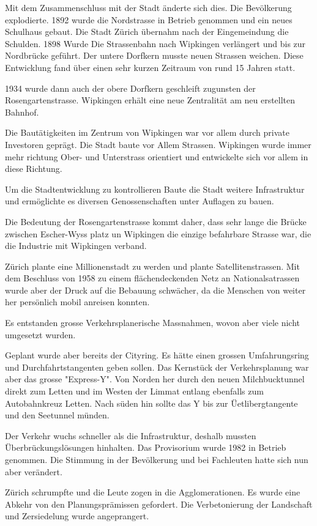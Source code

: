 \documentclass[a4paper,11pt,ngerman]{scrartcl}
\begin{document}
Mit dem Zusammenschluss mit der Stadt änderte sich dies. Die Bevölkerung
explodierte. 1892 wurde die Nordstrasse in Betrieb genommen und ein neues
Schulhaus gebaut. Die Stadt Zürich übernahm nach der Eingemeindung die
Schulden. 1898 Wurde Die Strassenbahn nach Wipkingen verlängert und bis zur
Nordbrücke geführt. Der untere Dorfkern musste neuen Strassen weichen. Diese
Entwicklung fand über einen sehr kurzen Zeitraum von rund 15 Jahren statt.

1934 wurde dann auch der obere Dorfkern geschleift zugunsten der
Rosengartenstrasse. Wipkingen erhält eine neue Zentralität am neu erstellten
Bahnhof.

Die Bautätigkeiten im Zentrum von Wipkingen war vor allem durch private
Investoren geprägt. Die Stadt baute vor Allem Strassen. Wipkingen wurde
immer mehr richtung Ober- und Unterstrass orientiert und entwickelte sich
vor allem in diese Richtung.

Um die Stadtentwicklung zu kontrollieren Baute die Stadt weitere
Infrastruktur und ermöglichte es diversen Genossenschaften unter Auflagen zu
bauen.

Die Bedeutung der Rosengartenstrasse kommt daher, dass sehr lange die Brücke
zwischen Escher-Wyss platz un Wipkingen die einzige befahrbare Strasse war,
die die Industrie mit Wipkingen verband.

Zürich plante eine Millionenstadt zu werden und plante
Satellitenstrassen. Mit dem Beschluss von 1958 zu einem flächendeckenden
Netz an Nationalsatrassen wurde aber der Druck auf die Bebauung schwächer,
da die Menschen von weiter her persönlich mobil anreisen konnten.

Es entstanden grosse Verkehrsplanerische Massnahmen, wovon aber viele nicht
umgesetzt wurden.

Geplant wurde aber bereits der Cityring. Es hätte einen grossen
Umfahrungsring und Durchfahrtstangenten geben sollen. Das Kernstück der
Verkehrsplanung war aber das grosse "Express-Y". Von Norden her durch den
neuen Milchbucktunnel direkt zum Letten und im Westen der Limmat entlang
ebenfalls zum Autobahnkreuz Letten. Nach süden hin sollte das Y bis zur
Üetlibergtangente und den Seetunnel münden.

Der Verkehr wuchs schneller als die Infrastruktur, deshalb mussten
Überbrückungslösungen hinhalten. Das Provisorium wurde 1982 in Betrieb
genommen. Die Stimmung in der Bevölkerung und bei Fachleuten hatte sich nun
aber verändert.

Zürich schrumpfte und die Leute zogen in die Agglomerationen. Es wurde eine
Abkehr von den Planungsprämissen gefordert. Die Verbetonierung der
Landschaft und Zersiedelung wurde angeprangert.
\end{document}
